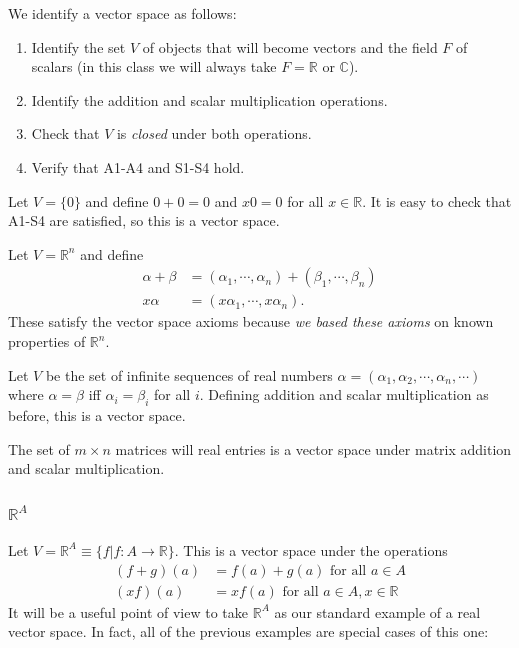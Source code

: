\documentclass[12pt,letterpaper,reqno]{article}
\numberwithin{equation}{section}
\newcommand{\ti}[1]{\textit{#1}}
\begin{document}
We identify a vector space as follows:

\begin{enumerate}
	\item Identify the set $V$ of objects that will become vectors and the field $F$ of scalars (in this class we will always take $F=\mathbb{R}$ or $\mathbb{C}$).
	\item Identify the addition and scalar multiplication operations.
	\item Check that $V$ is \emph{closed} under both operations.
	\item Verify that A1-A4 and S1-S4 hold. 
\end{enumerate}

\begin{example}
	Let $V=\{0\}$ and define $0+0=0$ and $x0=0$ for all $x \in \mathbb{R}$. It is easy to check that A1-S4 are satisfied, so this is a vector space.
\end{example}

\begin{example}[$\mathbb{R}^n$]
	Let $V=\mathbb{R}^n$ and define
\begin{align*}
	\alpha+\beta &=(\alpha_1,\cdots,\alpha_n)+(\beta_1,\cdots, \beta_n) \\
	x\alpha &=(x\alpha_1,\cdots,x\alpha_n).
\end{align*} These satisfy the vector space axioms because \ti{we based these axioms} on known properties of $\mathbb{R}^n$.
\end{example}

\begin{example}
	Let $V$ be the set of infinite sequences of real numbers $\alpha=(\alpha_1,\alpha_2,\cdots, \alpha_n,\cdots)$ where $\alpha=\beta$ iff $\alpha_i=\beta_i$ for all $i$. Defining addition and scalar multiplication as before, this is a vector space.
\end{example}

\begin{example}[$\mathbb{R}^{m,n}$]
	The set of $m \times n$ matrices will real entries is a vector space under matrix addition and scalar multiplication.
\end{example}

\subsubsection{$\mathbb{R}^A$}
Let $V=\mathbb{R}^A\equiv \{f|f:A \to \mathbb{R}\}$. This is a vector space under the operations
\begin{align*}
	(f+g)(a)&=f(a)+g(a) \text{ for all } a \in A\\
	(xf)(a)&=xf(a) \text{ for all } a \in A, x \in \mathbb{R} 
\end{align*}
It will be a useful point of view to take $\mathbb{R}^A$ as our standard example of a real vector space. In fact, all of the previous examples are special cases of this one: 
\end{document}
